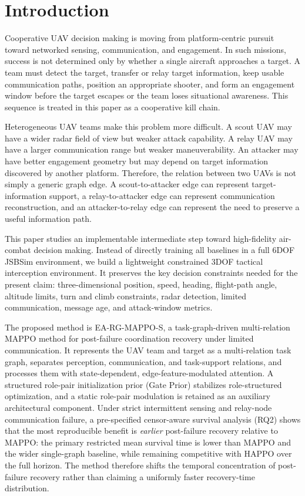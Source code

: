 \section{Introduction}

Cooperative UAV decision making is moving from platform-centric pursuit toward networked sensing, communication, and engagement. In such missions, success is not determined only by whether a single aircraft approaches a target. A team must detect the target, transfer or relay target information, keep usable communication paths, position an appropriate shooter, and form an engagement window before the target escapes or the team loses situational awareness. This sequence is treated in this paper as a cooperative kill chain.

Heterogeneous UAV teams make this problem more difficult. A scout UAV may have a wider radar field of view but weaker attack capability. A relay UAV may have a larger communication range but weaker maneuverability. An attacker may have better engagement geometry but may depend on target information discovered by another platform. Therefore, the relation between two UAVs is not simply a generic graph edge. A scout-to-attacker edge can represent target-information support, a relay-to-attacker edge can represent communication reconstruction, and an attacker-to-relay edge can represent the need to preserve a useful information path.

This paper studies an implementable intermediate step toward high-fidelity air-combat decision making. Instead of directly training all baselines in a full 6DOF JSBSim environment, we build a lightweight constrained 3DOF tactical interception environment. It preserves the key decision constraints needed for the present claim: three-dimensional position, speed, heading, flight-path angle, altitude limits, turn and climb constraints, radar detection, limited communication, message age, and attack-window metrics.

The proposed method is EA-RG-MAPPO-S, a task-graph-driven multi-relation MAPPO method for post-failure coordination recovery under limited communication. It represents the UAV team and target as a multi-relation task graph, separates perception, communication, and task-support relations, and processes them with state-dependent, edge-feature-modulated attention. A structured role-pair initialization prior (Gate Prior) stabilizes role-structured optimization, and a static role-pair modulation is retained as an auxiliary architectural component. Under strict intermittent sensing and relay-node communication failure, a pre-specified censor-aware survival analysis (RQ2) shows that the most reproducible benefit is \emph{earlier} post-failure recovery relative to MAPPO: the primary restricted mean survival time is lower than MAPPO and the wider single-graph baseline, while remaining competitive with HAPPO over the full horizon. The method therefore shifts the temporal concentration of post-failure recovery rather than claiming a uniformly faster recovery-time distribution.

